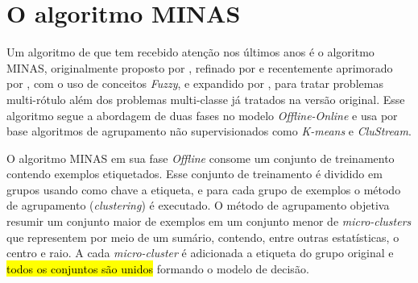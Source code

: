 



\section{O algoritmo MINAS}\label{sec:minas-og}

Um algoritmo de \nd que tem recebido atenção nos últimos anos é o algoritmo
MINAS, originalmente proposto por , refinado por
 e recentemente aprimorado por
, com o uso de conceitos \emph{Fuzzy}, e expandido por
, para tratar problemas multi-rótulo além dos problemas
multi-classe já tratados na versão original.
Esse algoritmo segue a abordagem de duas fases no modelo \emph{Offline-Online} e
usa por base algoritmos de agrupamento não supervisionados como \emph{K-means} e
\emph{CluStream}.


\newcommand{\mcluster}{\emph{micro-cluster}\xspace}
\newcommand{\mclusters}{\emph{micro-clusters}\xspace}


O algoritmo MINAS em sua fase \emph{Offline} consome um conjunto de treinamento
contendo exemplos etiquetados.
Esse conjunto de treinamento é dividido em grupos usando como chave a etiqueta,
e para cada grupo de exemplos o método de agrupamento (\emph{clustering}) é executado.
O método de agrupamento objetiva resumir um conjunto maior de exemplos em
um conjunto menor de \mclusters que representem por meio de um sumário,
contendo, entre outras estatísticas, o centro e raio.
A cada \mcluster é adicionada a etiqueta do grupo original e 
\hl{todos os conjuntos são unidos} formando o modelo de decisão.

